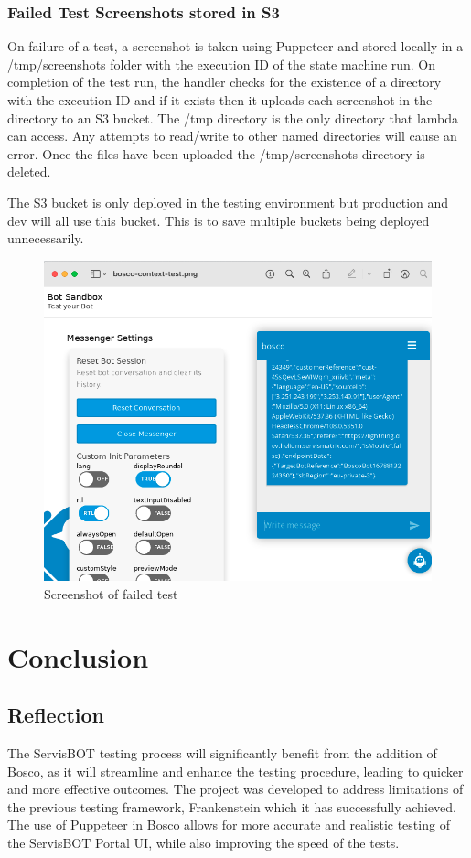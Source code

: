 \documentclass[12pt,a4paper,titlepage]{report}
\begin{document}
\subsection{Failed Test Screenshots stored in S3}
On failure of a test, a screenshot is taken using Puppeteer and stored locally in a /tmp/screenshots folder with the execution ID of the state 
machine run. On completion of the test run, the handler checks for the existence of a directory with the execution ID and if 
it exists then it uploads each screenshot in the directory to an S3 bucket. The /tmp directory is the only directory that lambda can access. 
Any attempts to read/write to other named directories will cause an error. 
Once the files have been uploaded the /tmp/screenshots directory is deleted.

The S3 bucket is only deployed in the testing environment but production and dev will all use this bucket. 
This is to save multiple buckets being deployed unnecessarily.

\begin{figure}[ht]
  \centering
  \includegraphics[width=\textwidth,height=\textheight,keepaspectratio]{./diagrams/screenshot.png}
  \caption{Screenshot of failed test}
 \end{figure}

\chapter{Conclusion}
\section{Reflection}
The ServisBOT testing process will significantly benefit from the addition of Bosco, as it will streamline and enhance the testing procedure, leading to quicker and more effective outcomes.
The project was developed to address limitations of the previous testing framework, Frankenstein which it has successfully achieved.
The use of Puppeteer in Bosco allows for more accurate and realistic testing of the ServisBOT Portal UI, while also improving the speed of the tests.
\end{document}
